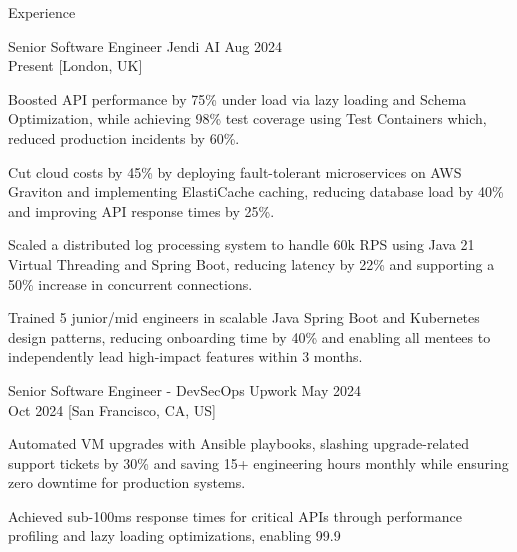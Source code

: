 \begin{rSection}{Experience}
    \begin{rSubsection}
        {Senior Software Engineer}
        {Jendi AI}
        {Aug 2024 \\ Present}
        [London, UK]
        \begin{rItemize}
            \item Boosted API performance by 75\% under load via lazy loading and Schema Optimization, while achieving 98\% test coverage using Test Containers which, reduced production incidents by 60\%.
            \item Cut cloud costs by 45\% by deploying fault-tolerant microservices on AWS Graviton and implementing ElastiCache caching, reducing database load by 40\% and improving API response times by 25\%.
            \item Scaled a distributed log processing system to handle 60k RPS using Java 21 Virtual Threading and Spring Boot, reducing latency by 22\% and supporting a 50\% increase in concurrent connections.
            \item Trained 5 junior/mid engineers in scalable Java Spring Boot and Kubernetes design patterns, reducing onboarding time by 40\% and enabling all mentees to independently lead high-impact features within 3 months.
        \end{rItemize}
    \end{rSubsection}

    \begin{rSubsection}
        {Senior Software Engineer - DevSecOps}
        {Upwork}
        {May 2024 \\ Oct 2024}
        [San Francisco, CA, US]
        \begin{rItemize}
            \item Automated VM upgrades with Ansible playbooks, slashing upgrade-related support tickets by 30\% and saving 15+ engineering hours monthly while ensuring zero downtime for production systems.
            \item Achieved sub-100ms response times for critical APIs through performance profiling and lazy loading optimizations, enabling 99.9%
        \end{rItemize}
    \end{rSubsection}


\end{rSection}
